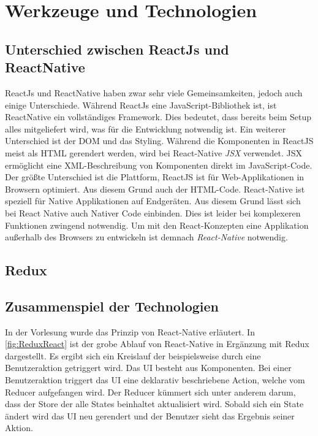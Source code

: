 \section{Werkzeuge und Technologien}
\subsection{Unterschied zwischen ReactJs und ReactNative}
ReactJs und ReactNative haben zwar sehr viele Gemeinsamkeiten, jedoch auch einige Unterschiede.
Während ReactJs eine JavaScript-Bibliothek ist, ist ReactNative ein vollständiges Framework. Dies bedeutet, dass bereits beim Setup alles mitgeliefert wird, was für die
Entwicklung notwendig ist. Ein weiterer Unterschied ist der DOM und das Styling. Während die Komponenten in ReactJS meist als HTML gerendert werden, wird bei React-Native
\textit{JSX} verwendet. JSX ermöglicht eine XML-Beschreibung von Komponenten direkt im JavaScript-Code.\\
Der größte Unterschied ist die Plattform, ReactJS ist für Web-Applikationen in Browsern optimiert. Aus diesem Grund auch der HTML-Code. React-Native ist speziell für Native Applikationen auf
Endgeräten. Aus diesem Grund lässt sich bei React Native auch Nativer Code einbinden. Dies ist leider bei komplexeren Funktionen zwingend notwendig. Um mit den React-Konzepten eine Applikation außerhalb des
Browsers zu entwickeln ist demnach \textit{React-Native} notwendig. \cite{ReactJSvsReactNative:online}
\subsection{Redux}

\subsection{Zusammenspiel der Technologien}
In der Vorlesung wurde das Prinzip von React-Native erläutert. In \autoref{fig:ReduxReact} ist
der grobe Ablauf von React-Native in Ergänzung mit Redux dargestellt. Es ergibt sich ein Kreislauf der beispielsweise durch
eine Benutzeraktion getriggert wird. Das UI besteht aus Komponenten. Bei einer Benutzeraktion
triggert das UI eine deklarativ beschriebene Action, welche vom Reducer aufgefangen wird.
Der Reducer kümmert sich unter anderem darum, dass der Store der alle States beinhaltet aktualisiert wird.
Sobald sich ein State ändert wird das UI neu gerendert und der Benutzer sieht das Ergebnis seiner Aktion.

